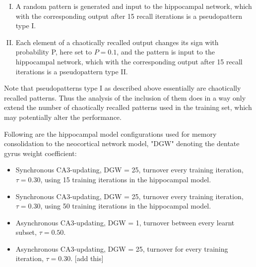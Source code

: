\begin{enumerate}[I.]
    \item A random pattern is generated and input to the hippocampal network, which with the corresponding output after 15 recall iterations is a pseudopattern type I.
    \item Each element of a chaotically recalled output changes its sign with probability P, here set to $P=0.1$, and the pattern is input to the hippocampal network, which with the corresponding output after 15 recall iterations is a pseudopattern type II.
\end{enumerate}

Note that pseudopatterns type I as described above essentially are chaotically recalled patterns. Thus the analysis of the inclusion of them does in a way only extend the number of chaotically recalled patterns used in the training set, which may potentially alter the performance.

Following are the hippocampal model configurations used for memory consolidation to the neocortical network model, "DGW" denoting the dentate gyrus weight coefficient:

\begin{itemize}
    \item Synchronous CA3-updating, DGW = 25, turnover every training iteration, $\tau=0.30$, using 15 training iterations in the hippocampal model.
    \item Synchronous CA3-updating, DGW = 25, turnover every training iteration, $\tau=0.30$, using 50 training iterations in the hippocampal model.
    \item Asynchronous CA3-updating, DGW = 1, turnover between every learnt subset, $\tau=0.50$.
    \item Asynchronous CA3-updating, DGW = 25, turnover for every training iteration, $\tau=0.30$. [add this]
\end{itemize}

